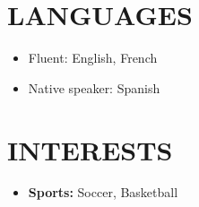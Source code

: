 \documentclass{res}
\begin{document}
\begin{resume}
		
	
	
	
	\section{\MakeUppercase{Languages}} \vskip 0.35in
	
	\begin{itemize}[leftmargin=\parindent]
	\setlength{\itemsep}{0mm}
	\item[] Fluent: English, French
	\item[] Native speaker: Spanish
	\end{itemize}
	
	
	
	\section{\MakeUppercase{Interests}} \vskip 0.35in
	
	\begin{itemize}[leftmargin=\parindent]
	\setlength{\itemsep}{0mm}
	\item[] {\bf Sports:} Soccer, Basketball
	\end{itemize}
	
	
	
	\end{resume}
	
\end{document}
